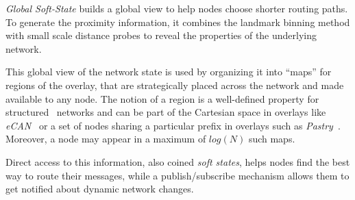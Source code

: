 \emph{Global Soft-State} \cite{XTZ2003} builds a global view to help nodes
choose shorter routing paths. To generate the proximity information, it 
combines the landmark binning method with small
scale distance probes to reveal the properties 
of the underlying network. 

This global view of the network state is used by organizing it into ``maps'' for
regions of the overlay, that are strategically placed
across the network and made available to any node. The notion of a
region is a well-defined property for structured \p\ networks and can be part of
the Cartesian space in overlays like \emph{eCAN}~\cite{xu_ecan_2002} or a set of
nodes sharing a particular prefix in overlays such as
\emph{Pastry}~\cite{antony_pastry_2001}. Moreover, a node may appear in a maximum
of $log(N)$ such maps.

Direct access to this information, also coined \emph{soft states}, helps nodes
find the best way to route their messages, while a publish/subscribe mechanism
allows them to get notified about dynamic network changes.

